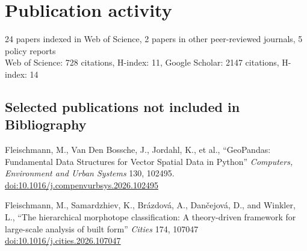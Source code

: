 \documentclass[11pt,a4paper]{report}
\begin{document}
    \section*{Publication activity}

    24 papers indexed in Web of Science, 2 papers in other peer-reviewed journals, 5 policy reports \\
    Web of Science: 728 citations, H-index: 11, Google Scholar: 2147 citations, H-index: 14

    \subsection*{Selected publications not included in Bibliography}

    \begin{tablist}

        \item[2026] \tab{}Fleischmann, M., Van Den Bossche, J., Jordahl, K., et al., \enquote{GeoPandas: Fundamental Data Structures for Vector Spatial Data in Python} \textit{Computers, Environment and Urban Systems} 130, 102495. \href{https://doi.org/10.1016/j.compenvurbsys.2026.102495}{doi:10.1016/j.compenvurbsys.2026.102495}



        \item[2026] \tab{}Fleischmann, M., Samardzhiev, K., Brázdová, A., Dančejová, D., and Winkler, L., \enquote{The hierarchical morphotope classification: A theory-driven framework for large-scale analysis of built form} \textit{Cities} 174, 107047 \href{https://doi.org/10.1016/j.cities.2026.107047}{doi:10.1016/j.cities.2026.107047}


\end{tablist}
\end{document}
